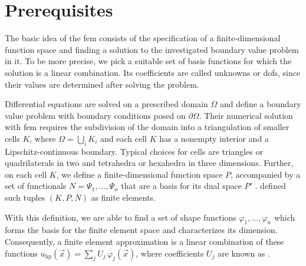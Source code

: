 \section{Prerequisites}
\label{sec:prerequisites}
\glsresetall


The basic idea of the \gls{fem} consists of the specification of a finite-dimensional function space and finding a solution to the investigated boundary value problem in it. To be more precise, we pick a suitable set of basis functions for which the solution is a linear combination. Its coefficients are called unknowns or \glspl{dof}, since their values are determined after solving the problem.

Differential equations are solved on a prescribed domain $\Omega$ and define a boundary value problem with boundary conditions posed on $\partial \Omega$.
Their numerical solution with \gls{fem} requires the subdivision of the domain into a triangulation of smaller cells $K$, where $\Omega = \bigcup_{i} K_i$ and each cell $K$ has a nonempty interior and a Lipschitz-continuous boundary. Typical choices for cells are triangles or quadrilaterals in two and tetrahedra or hexahedra in three dimensions.
Further, on each cell $K$, we define a finite-dimensional function space $P$, accompanied by a set of functionals $N = {\Psi_1, \ldots, \Psi_n}$ that are a basis for its dual space $P'$
. \textcite[Sec.~2.1]{ciarlet1978} defined such tuples $(K,P,N)$ as finite elements.

With this definition, we are able to find a set of shape functions ${\varphi_1, \ldots, \varphi_n}$ which forms the basis for the finite element space and characterizes its dimension.
Consequently, a finite element approximation is a linear combination of these functions $u_{\text{hp}}(\vec{x}) = \sum_{j} U_j \, \varphi_j(\vec{x})$, where coefficients $U_j$ are known as .

